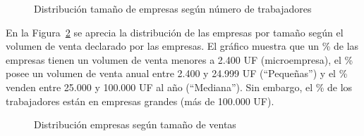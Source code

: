\documentclass[
  11pt,
]{article}
\begin{document}
\FloatBarrier

\begin{figure}[H]

\caption{\label{fig-tam}Distribución tamaño de empresas según número de
trabajadores}


\end{figure}%

\FloatBarrier

En la Figura~\ref{fig-tamvent} se aprecia la distribución de las
empresas por tamaño según el volumen de venta declarado por las
empresas. El gráfico muestra que un \% de las empresas tienen
un volumen de venta menores a 2.400 UF (microempresa), el \%
posee un volumen de venta anual entre 2.400 y 24.999 UF (``Pequeñas'') y
el \% venden entre 25.000 y 100.000 UF al año (``Mediana'').
Sin embargo, el \% de los trabajadores están en empresas
grandes (más de 100.000 UF).

\begin{figure}[H]

\caption{\label{fig-tamvent}Distribución empresas según tamaño de
ventas}


\end{figure}%
\end{document}
